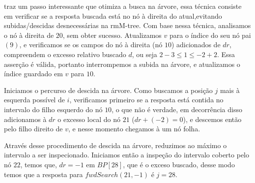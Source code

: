 \begin{example}
        \citet{book-compact-data-structures} traz um passo interessante que otimiza a busca na árvore, essa técnica consiste em  verificar se a resposta buscada está no nó à direita do atual,evitando subidas/descidas desnecessárias na rmM-tree. Com base nessa técnica, analisamos o nó à direita de $20$, sem obter sucesso. Atualizamos  $v$ para o índice do seu nó pai $(9)$, e verificamos se os campos do nó à direita (nó $10$) adicionados de $dr$, compreendem o excesso relativo buscado $d$, ou seja $2 -3 \leq 1 \leq -2 +2$. Essa asserção é válida, portanto interrompemos a subida na árvore, e atualizamos o índice guardado em $v$ para $10$. 
        
        Iniciamos o percurso de descida na árvore. Como buscamos a posição $j$ mais à esquerda possível de $i$, verificamos primeiro se a resposta está contida no intervalo do filho esquerdo do nó $10$, o que não é verdade, em decorrência disso adicionamos à $dr$ o excesso local do nó $21$ ($dr + (-2)= 0$), e descemos então pelo filho direito de $v$, e nesse momento chegamos à um nó folha.
         
         Através desse procedimento de descida na árvore, reduzimos ao máximo o intervalo a ser inspecionado. Iniciamos então a inspeção do intervalo coberto pelo nó $22$, temos que, $dr=-1$ em $BP[28]$, que é o exceso buscado, desse modo temos que a resposta para $fwdSearch(21,-1)$ é $j=28$.
    \end{example}
    
